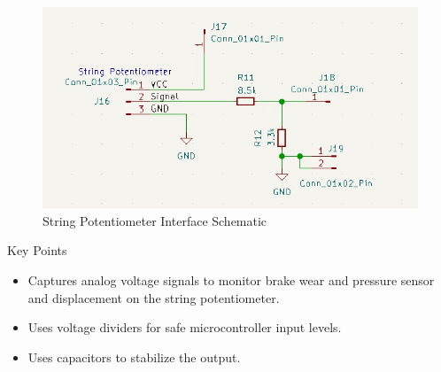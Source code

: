 \documentclass[8pt,compress,aspectratio=169]{beamer}
\begin{document}
\begin{frame}
\begin{minipage}{0.49\textwidth}
\begin{figure}
      \includegraphics[width=\textwidth]{assets/electronic/string_pcb.jpg}
      \caption{String Potentiometer Interface Schematic}
    \end{figure}

    \vspace{-0.5cm}
    \begin{block}{Key Points}
      \begin{itemize}
        \item Captures analog voltage signals to monitor brake wear and pressure sensor and displacement on the string potentiometer.
        \item Uses voltage dividers for safe microcontroller input levels.
        \item Uses capacitors to stabilize the output.
      \end{itemize}
    \end{block}
  \end{minipage}
\end{frame}
\end{document}
